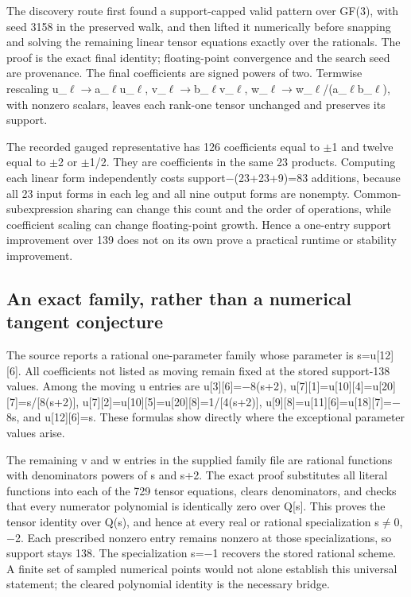 \documentclass[11pt,a4paper]{article}
\begin{document}
The discovery route first found a support-capped valid pattern over GF(3), with seed 3158 in the preserved walk, and then lifted it numerically before snapping and solving the remaining linear tensor equations exactly over the rationals. The proof is the exact final identity; floating-point convergence and the search seed are provenance. The final coefficients are signed powers of two. Termwise rescaling u\_\ensuremath{\ell}\ensuremath{\to}a\_\ensuremath{\ell}u\_\ensuremath{\ell}, v\_\ensuremath{\ell}\ensuremath{\to}b\_\ensuremath{\ell}v\_\ensuremath{\ell}, w\_\ensuremath{\ell}\ensuremath{\to}w\_\ensuremath{\ell}/(a\_\ensuremath{\ell}b\_\ensuremath{\ell}), with nonzero scalars, leaves each rank-one tensor unchanged and preserves its support.

The recorded gauged representative has 126 coefficients equal to \ensuremath{\pm}1 and twelve equal to \ensuremath{\pm}2 or \ensuremath{\pm}1/2. They are coefficients in the same 23 products. Computing each linear form independently costs support\ensuremath{-}(23+23+9)=83 additions, because all 23 input forms in each leg and all nine output forms are nonempty. Common-subexpression sharing can change this count and the order of operations, while coefficient scaling can change floating-point growth. Hence a one-entry support improvement over 139 does not on its own prove a practical runtime or stability improvement.

\subsection{An exact family, rather than a numerical tangent conjecture}
The source reports a rational one-parameter family whose parameter is s=u[12][6]. All coefficients not listed as moving remain fixed at the stored support-138 values. Among the moving u entries are u[3][6]=\ensuremath{-}8(s+2), u[7][1]=u[10][4]=u[20][7]=s/[8(s+2)], u[7][2]=u[10][5]=u[20][8]=1/[4(s+2)], u[9][8]=u[11][6]=u[18][7]=\ensuremath{-}8s, and u[12][6]=s. These formulas show directly where the exceptional parameter values arise.

The remaining v and w entries in the supplied family file are rational functions with denominators powers of s and s+2. The exact proof substitutes all literal functions into each of the 729 tensor equations, clears denominators, and checks that every numerator polynomial is identically zero over Q[s]. This proves the tensor identity over Q(s), and hence at every real or rational specialization s\ensuremath{\neq}0,\ensuremath{-}2. Each prescribed nonzero entry remains nonzero at those specializations, so support stays 138. The specialization s=\ensuremath{-}1 recovers the stored rational scheme. A finite set of sampled numerical points would not alone establish this universal statement; the cleared polynomial identity is the necessary bridge.
\end{document}
